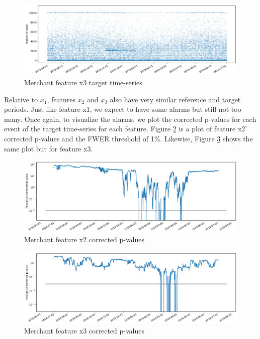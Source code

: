 \begin{figure}[!htb]
    \begin{center}
      \includegraphics[scale=0.5]{figures/merchant-x3-target.pdf}
      \caption{Merchant feature x3 target time-series}
      \label{fig:merchant-x3-target}
    \end{center}
\end{figure}
\clearpage
Relative to $x_1$, features $x_2$ and $x_3$ also have very similar reference and target periods. Just like feature x1, we expect to have some alarms but still not too many. Once again, to visualize the alarms, we plot the corrected p-values for each event of the target time-series for each feature. Figure \ref{fig:merchant-x2-correctedpvalues} is a plot of feature x2' corrected p-values and the FWER threshold of 1\%. Likewise, Figure \ref{fig:merchant-x3-correctedpvalues} shows the same plot but for feature x3.
\begin{figure}[!htb]
    \begin{center}
      \includegraphics[scale=0.5]{figures/merchant-x2-correctedpvalues.pdf}
      \caption{Merchant feature x2 corrected p-values}
      \label{fig:merchant-x2-correctedpvalues}
    \end{center}
\end{figure}
\begin{figure}[!htb]
    \begin{center}
      \includegraphics[scale=0.5]{figures/merchant-x3-correctedpvalues.pdf}
      \caption{Merchant feature x3 corrected p-values}
      \label{fig:merchant-x3-correctedpvalues}
    \end{center}
\end{figure}
